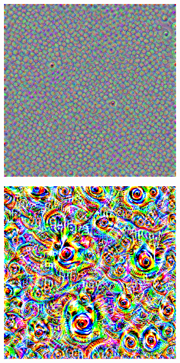 \newpage
\begin{figure}
    \captionsetup{justification=centering}

    \begin{subfigure}[t]{0.31\textwidth}
        \captionsetup{justification=centering}
        \centering
        \includegraphics[width=.7\linewidth]{figuras/feat_vis/experiments/intermediary/l9/random_image_pl1_lr4e-1_layer19.png}
        \caption{}
    \end{subfigure}
    \hfill
    \begin{subfigure}[t]{0.31\textwidth}
        \captionsetup{justification=centering}
        \centering
        \includegraphics[width=.7\linewidth]{figuras/feat_vis/experiments/intermediary/l9/random_image_pl4_lr4e-1_layer19_no-blur.png}
        \caption{}
    \end{subfigure}

\end{figure}
